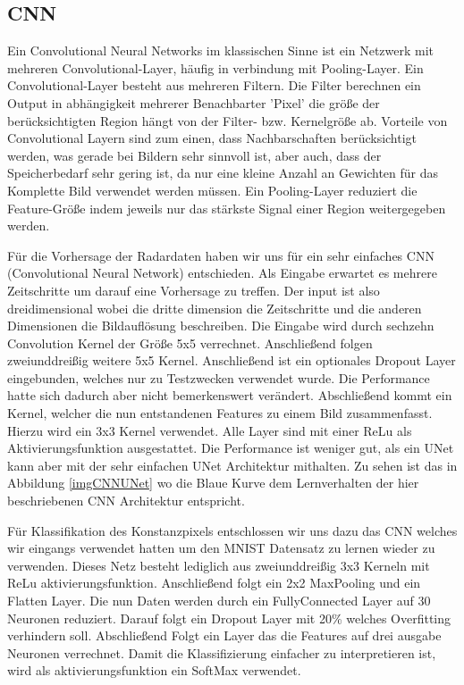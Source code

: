 \subsection{CNN}
\label{kapitelCNN}
Ein Convolutional Neural Networks im klassischen Sinne ist ein Netzwerk mit mehreren Convolutional-Layer, häufig in verbindung mit Pooling-Layer. Ein Convolutional-Layer besteht aus mehreren Filtern. Die Filter berechnen ein Output in abhängigkeit mehrerer Benachbarter 'Pixel' die größe der berücksichtigten Region hängt von der Filter- bzw. Kernelgröße ab.
Vorteile von Convolutional Layern sind zum einen, dass Nachbarschaften berücksichtigt werden, was gerade bei Bildern sehr sinnvoll ist, aber auch, dass der Speicherbedarf sehr gering ist, da nur eine kleine Anzahl an Gewichten für das Komplette Bild verwendet werden müssen.
Ein Pooling-Layer reduziert die Feature-Größe indem jeweils nur das stärkste Signal einer Region weitergegeben werden.

Für die Vorhersage der Radardaten haben wir uns für ein sehr einfaches CNN (Convolutional Neural Network) entschieden.
Als Eingabe erwartet es mehrere Zeitschritte um darauf eine Vorhersage zu treffen. Der input ist also dreidimensional wobei die dritte dimension die Zeitschritte und die anderen Dimensionen die Bildauflösung beschreiben. Die Eingabe wird durch sechzehn Convolution Kernel der Größe 5x5 verrechnet. Anschließend folgen zweiunddreißig weitere 5x5 Kernel. Anschließend ist ein optionales Dropout Layer eingebunden, welches nur zu Testzwecken verwendet wurde. Die Performance hatte sich dadurch aber nicht bemerkenswert verändert. Abschließend kommt ein Kernel, welcher die nun entstandenen Features zu einem Bild zusammenfasst. Hierzu wird ein 3x3 Kernel verwendet. Alle Layer sind mit einer ReLu als Aktivierungsfunktion ausgestattet.
Die Performance ist weniger gut, als ein UNet kann aber mit der sehr einfachen UNet Architektur mithalten. Zu sehen ist das in Abbildung \ref{imgCNNUNet} wo die Blaue Kurve dem Lernverhalten der hier beschriebenen CNN Architektur entspricht.

Für Klassifikation des Konstanzpixels entschlossen wir uns dazu das CNN welches wir eingangs verwendet hatten um den MNIST Datensatz zu lernen wieder zu verwenden. Dieses Netz besteht lediglich aus zweiunddreißig 3x3 Kerneln mit ReLu aktivierungsfunktion. Anschließend folgt ein 2x2 MaxPooling und ein Flatten Layer. Die nun  Daten werden durch ein FullyConnected Layer auf 30 Neuronen reduziert. Darauf folgt ein Dropout Layer mit 20\% welches Overfitting verhindern soll. Abschließend Folgt ein Layer das die Features auf drei ausgabe Neuronen verrechnet. Damit die Klassifizierung einfacher zu interpretieren ist, wird als aktivierungsfunktion ein SoftMax verwendet.

